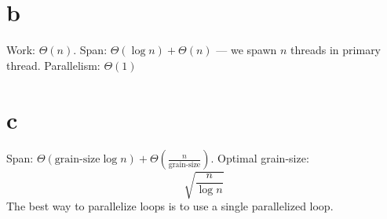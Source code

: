\documentclass[koma,a4paper]{article}
\begin{document}
\section{b}
Work: $\Theta(n)$. Span: $\Theta(\log n) + \Theta(n)$ --- we spawn $n$ threads in primary thread. Parallelism: $\Theta(1)$
\section{c}
Span: $\Theta(\text{grain-size}\log n) + \Theta(\frac{n}{\text{grain-size}})$. Optimal grain-size: $$\sqrt{\frac{n}{\log n}}$$
The best way to parallelize loops is to use a single parallelized loop.
\end{document}
